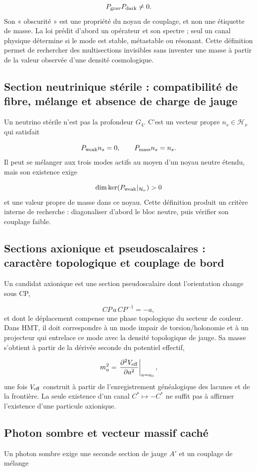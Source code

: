 \[
 P_{\rm grav}P_{\rm dark}\ne0.
\]
Son « obscurité » est une propriété du noyau de couplage, et non une étiquette de masse. La loi prédit d'abord un opérateur et son spectre ; seul un canal physique détermine si le mode est stable, métastable ou résonant. Cette définition permet de rechercher des multisections invisibles sans inventer une masse à partir de la valeur observée d'une densité cosmologique.

\subsection{Section neutrinique stérile : compatibilité de fibre, mélange et absence de charge de jauge}
Un neutrino stérile n'est pas la profondeur \(G_4\). C'est un vecteur propre \(n_s\in\mathcal H_\nu\) qui satisfait

\[
 P_{\rm weak}n_s=0,\qquad
 P_{\rm mass}n_s=n_s.
\]
Il peut se mélanger aux trois modes actifs au moyen d'un noyau neutre étendu, mais son existence exige

\[
 \dim\ker(P_{\rm weak}|_{\mathcal H_\nu})>0
\]
et une valeur propre de masse dans ce noyau. Cette définition produit un critère interne de recherche : diagonaliser d'abord le bloc neutre, puis vérifier son couplage faible.

\subsection{Sections axionique et pseudoscalaires : caractère topologique et couplage de bord}
Un candidat axionique est une section pseudoscalaire dont l'orientation change sous CP,

\[
 CP\,a\,CP^{-1}=-a,
\]
et dont le déplacement compense une phase topologique du secteur de couleur. Dans HMT, il doit correspondre à un mode impair de torsion/holonomie et à un projecteur qui entrelace ce mode avec la densité topologique de jauge. Sa masse s'obtient à partir de la dérivée seconde du potentiel effectif,

\[
 m_a^2=
 \left.\frac{\partial^2V_{\rm eff}}{\partial a^2}\right|_{a=a_0},
\]
une fois \(V_{\rm eff}\) construit à partir de l'enregistrement généalogique des lacunes et de la frontière. La seule existence d'un canal \(C^*\mapsto-C^*\) ne suffit pas à affirmer l'existence d'une particule axionique.

\subsection{Photon sombre et vecteur massif caché}
Un photon sombre exige une seconde section de jauge \(A'\) et un couplage de mélange

